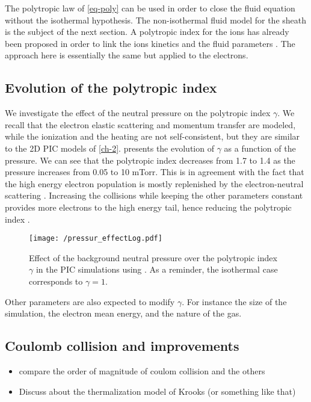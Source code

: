 The polytropic law of \cref{eq-poly} can be used in order to close the fluid equation without the isothermal hypothesis.
The non-isothermal fluid model for the sheath is the subject of the next section.
A polytropic index for the ions has already been proposed in order to link the ions kinetics and the fluid parameters \citep{kuhn2006,jelic2007}.
The approach here is essentially the same but applied to the electrons.


\subsection{Evolution of the polytropic index}

We investigate the effect of the neutral pressure on the polytropic index $\gamma$.
We recall that the electron elastic scattering and momentum transfer are modeled, while the ionization and the heating are not self-consistent, but they are similar to the \ac{2D} \ac{PIC} models of \cref{ch-2}.
 presents the evolution of $\gamma$ as a function of the pressure.
We can see that the polytropic index decreases from 1.7 to 1.4 as the pressure increases from 0.05 to 10 mTorr.
This is in agreement with the fact that the high energy electron population is mostly replenished by the electron-neutral scattering \cite{kaganovich2007}.
Increasing the collisions while keeping the other parameters constant provides more electrons to the high energy tail, hence reducing the polytropic index \citep{zhang2016}.

\begin{figure}[!htbp]
  \centering
  \texttt{[image: /pressur\_effectLog.pdf]}
  \caption{Effect of the background neutral pressure over the polytropic index $\gamma$ in the PIC simulations using . As a reminder, the isothermal case corresponds to $\gamma=1$.}
  \label{fig-p}
\end{figure}

Other parameters are also expected to modify $\gamma$.
For instance the size of the simulation, the electron mean energy, and the nature of the gas.

\subsection{Coulomb collision and improvements}

\begin{itemize}
  \item compare the order of magnitude of coulom collision and the others
  \item Discuss about the thermalization model of Krooks (or something like that)
\end{itemize}
